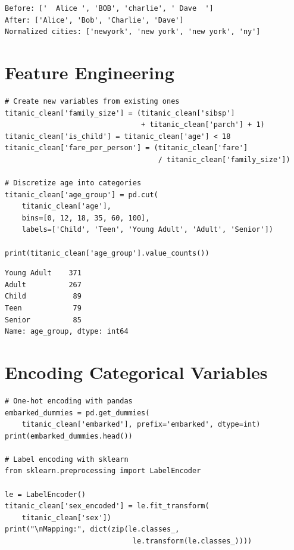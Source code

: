 \begin{codeoutput}
\begin{verbatim}
Before: ['  Alice ', 'BOB', 'charlie', ' Dave  ']
After: ['Alice', 'Bob', 'Charlie', 'Dave']
Normalized cities: ['newyork', 'new york', 'new york', 'ny']
\end{verbatim}
\end{codeoutput}

\section{Feature Engineering}

\begin{codeblock}[title=\textbf{Python}]
\begin{verbatim}
# Create new variables from existing ones
titanic_clean['family_size'] = (titanic_clean['sibsp']
                                + titanic_clean['parch'] + 1)
titanic_clean['is_child'] = titanic_clean['age'] < 18
titanic_clean['fare_per_person'] = (titanic_clean['fare']
                                    / titanic_clean['family_size'])

# Discretize age into categories
titanic_clean['age_group'] = pd.cut(
    titanic_clean['age'],
    bins=[0, 12, 18, 35, 60, 100],
    labels=['Child', 'Teen', 'Young Adult', 'Adult', 'Senior'])

print(titanic_clean['age_group'].value_counts())
\end{verbatim}
\end{codeblock}

\begin{codeoutput}
\begin{verbatim}
Young Adult    371
Adult          267
Child           89
Teen            79
Senior          85
Name: age_group, dtype: int64
\end{verbatim}
\end{codeoutput}

\section{Encoding Categorical Variables}

\begin{codeblock}[title=\textbf{Python}]
\begin{verbatim}
# One-hot encoding with pandas
embarked_dummies = pd.get_dummies(
    titanic_clean['embarked'], prefix='embarked', dtype=int)
print(embarked_dummies.head())

# Label encoding with sklearn
from sklearn.preprocessing import LabelEncoder

le = LabelEncoder()
titanic_clean['sex_encoded'] = le.fit_transform(
    titanic_clean['sex'])
print("\nMapping:", dict(zip(le.classes_,
                              le.transform(le.classes_))))
\end{verbatim}
\end{codeblock}

